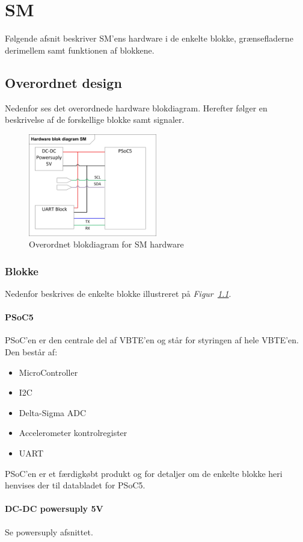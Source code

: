 \chapter{SM}
Følgende afsnit beskriver SM'ens hardware i de enkelte blokke, grænsefladerne derimellem samt funktionen af blokkene.

\section{Overordnet design}
Nedenfor ses det overordnede hardware blokdiagram. Herefter følger en beskrivelse af de forskellige blokke samt signaler.
\begin{figure}[H]
\centering
\includegraphics[width=0.5\textwidth]{billeder/SMHardware}
\caption{Overordnet blokdiagram for SM hardware}
\label{fig:HWSM}
\end{figure}
\subsection{Blokke}
Nedenfor beskrives de enkelte blokke illustreret på  \textit{Figur~\ref{fig:HWSM}}.
\subsubsection{PSoC5}
PSoC'en er den centrale del af VBTE'en og står for styringen af hele VBTE'en. Den består af:
\begin{itemize}
\item MicroController
\item I2C
\item Delta-Sigma ADC
\item Accelerometer kontrolregister
\item UART
\end{itemize}
PSoC'en er et færdigkøbt produkt og for detaljer om de enkelte blokke heri henvises der til databladet for PSoC5.
\subsubsection{DC-DC powersuply 5V}
Se powersuply afsnittet.
